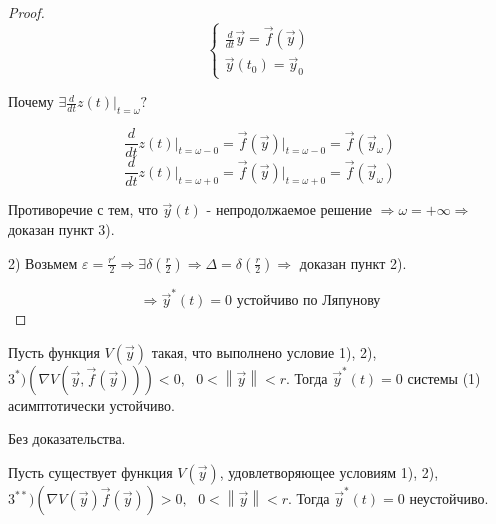 \documentclass[12pt, a4paper]{report}
\begin{document}
\begin{proof}
\[ \begin{cases}
    \displaystyle  \frac{d}{dt }  \vec{y}  = \vec{f }  (\vec{y}  ) \\ 
    \vec{y }  (t_0 ) = \vec{y}  _0
    \end{cases} \] 
    
    Почему \( \displaystyle  \exists  \frac{d}{dt }  z(t ) \bigg | _{ t = \omega } ?   \) 
    
    \[ \frac{d}{dt }  z(t ) \bigg | _{t = \omega  -0 }  = \vec{f }  (\vec{y } ) | _{t = \omega - 0 } = \vec{f }  (\vec{y } _{\omega} )   \] 
    \[ \frac{d}{dt }  z(t ) \bigg | _{t = \omega  +0 }  = \vec{f }  (\vec{y } ) | _{t = \omega +0 } = \vec{f }  (\vec{y } _{\omega} )   \] 
    
    Противоречие с тем, что \( \vec{y } (t) \) - непродолжаемое решение \( \Rightarrow \omega = + \infty  \Rightarrow  \) доказан пункт 3). 
    
    
    2) Возьмем \( \displaystyle  \varepsilon = \frac{r ' }{2 } \Rightarrow \exists  \delta \left(  \frac{r}{2 }  \right) \Rightarrow  \Delta  = \delta \left( \frac{r}{2 }  \right) \Rightarrow  \) доказан пункт 2). 
    
    \[  \Rightarrow \vec{y } ^* (t ) = 0  \text{ устойчиво по Ляпунову} \] 
\end{proof}

\begin{theorem} 
    Пусть функция \( V(\vec{y} ) \)  такая, что выполнено условие 1), 2), \( 3^*) (\nabla V (\vec{y }  ,\vec{f }  (\vec{y } ))) < 0  ,\text{ }  0 < \left\lVert  \vec{y }  \right\rVert < r  \). Тогда \( \vec{y } ^* (t ) = 0 \) системы (1) асимптотически устойчиво.

    Без доказательства.
\end{theorem}

\begin{theorem}
    Пусть существует функция \( V(\vec{y } ) \), удовлетворяющее условиям 1), 2),  \(3^{** } ) (\nabla V (\vec{y}  ) \vec{f } (\vec{y } ) ) >0 , \text{ }  0 < \left\lVert \vec{y }  \right\rVert < r  \). Тогда \( \vec{y } ^* (t ) = 0 \)   неустойчиво. 
\end{theorem}
\end{document}

